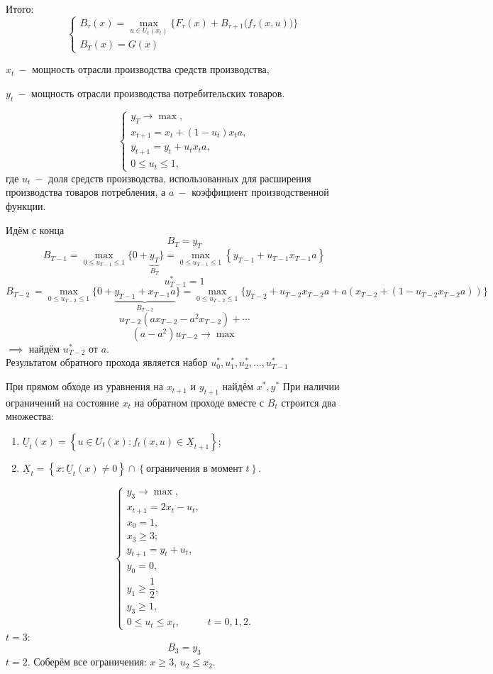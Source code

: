 \documentclass[a4paper,11pt]{article}
\begin{document}
Итого:
\[\begin{cases}
    \displaystyle B_\tau(x) = \max_{u\in U_t(x_t)}\bigg\{F_\tau(x) + B_{\tau+1}\big(f_\tau(x,u)\big)\bigg\}\\
    B_T(x) = G(x)
\end{cases}\]

$x_t\ -$ мощность отрасли производства средств производства,

$y_t\ -$ мощность отрасли производства потребительских товаров.

\[\begin{cases}
    y_T \to \max,\\
    x_{t+1} = x_t + (1 - u_t)x_ta,\\
    y_{t+1} = y_t + u_tx_ta,\\
    0 \leq u_t \leq 1,
\end{cases}\]
где $u_t\ -$ доля средств производства, использованных для расширения производства товаров потребления, а $a\ -$ коэффициент производственной функции.

Идём с конца
\[B_T = y_T\]
\[B_{T-1} = \max_{0\leq u_{T-1}\leq 1}\{0 + \underbrace{y_T}_{B_T}\} = \max_{0\leq u_{T-1}\leq 1}\left\{y_{T-1} + u_{T-1}x_{T-1}a\right\}\]
\[\boxed{u_{T-1}^* = 1}\]
\[B_{T-2}\ = \max_{0\leq u_{T-2}\leq 1}\big\{0 + \underbrace{y_{T-1} + x_{T-1}a}_{B_{T-2}}\big\} = \max_{0\leq u_{T-2}\leq 1}\big\{y_{T-2} + u_{T-2}x_{T-2}a + a(x_{T-2} + (1 - u_{T-2}x_{T-2}a))\big\}\]
\[u_{T-2}\left(ax_{T-2} - a^2x_{T-2}\right) + \cdots\]
\[\left(a - a^2\right)u_{T-2} \to \max\]
$\implies$ найдём $u_{T-2}^*$ от $a$.\\[1cm]
Результатом обратного прохода является набор $u_0^*, u_1^*, u_2^*,\dots,u_{T-1}^*$

При прямом обходе из уравнения на $x_{t+1}$ и $y_{t+1}$ найдём $x^*, y^*$
\newpage
{}
При наличии ограничений на состояние $x_t$ на обратном проходе вместе с $B_t$ строится два множества:
\begin{enumerate}
    \item $\underline{U}_t(x) = \left\{u\in U_t(x): f_t(x,u) \in \underline{X}_{t+1}\right\}$;
    \item $\underline{X}_{t} = \left\{x: \underline{U}_t(x) \neq 0\right\} \cap \left\{\text{ограничения в момент } t\right\}$.
\end{enumerate}
\[\begin{cases}
    y_3 \to \max,\\
    x_{t+1} = 2x_t - u_t,\\
    x_0 = 1,\\
    x_3 \geq 3;\\
    y_{t+1} = y_t + u_t,\\
    y_0 = 0,\\
    y_1 \geq \dfrac{1}{2},\\
    y_3 \geq 1,\\
    0 \leq u_t \leq x_t, & t = 0,1,2.
\end{cases}\]
$t = 3$:
\[B_3 = y_3\]
$t = 2$. Соберём все ограничения: $x \geq 3$, $u_2 \leq x_2$.
\end{document}
